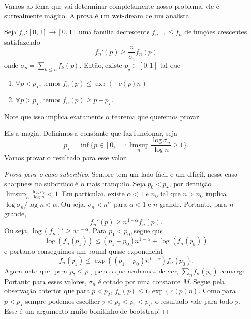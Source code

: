 Vamos ao lema que vai determinar completamente nosso problema, ele é
surrealmente mágico. A prova
é um wet-dream de um analista.

\begin{lemma}
	Seja $f_n : [0,1] \to [0,1]$ uma familia decrescente $f_{n+1} \leq
	f_n$ de funções crescentes
	satisfazendo
	\[
		f_n'(p) \geq \frac{n}{\sigma_n} f_n(p)
	\]
	onde $\sigma_n = \sum_{k \leq n} f_k(p)$. Então, existe $p_\star \in
	[0,1]$ tal que
	\begin{enumerate}
		\item $\forall p < p_\star$, temos $f_n(p) \leq \exp(-c(p)n)$.
		\item $\forall p > p_\star$, temos $f_n(p) \geq p - p_\star$.
	\end{enumerate}
\end{lemma}
\begin{remark}
	Note que isso implica exatamente o teorema que queremos provar.
\end{remark}

Eis a magia. Definimos a constante que faz funcionar, seja
\[
	p_\star = \inf \{ p \in [0,1] : \limsup_n \frac{\log \sigma_n}{\log
	n} \geq 1\}.
\]
Vamos provar o resultado para esse valor.

\begin{proof}[Prova para o caso subcrítico]
	Sempre tem um lado fácil e um difícil, nesse caso sharpness na subcrítico é
	o mais tranquilo. Seja $p_0 < p_\star$, por definição $\limsup_n
	\frac{\log \sigma_n}{\log n} < 1$.
	Em particular, existe $\alpha < 1$ e $n_0$ tal que $n > n_0$ implica
	$\log \sigma_n / \log n < \alpha$.
	Ou seja, $\sigma_n < n^{\alpha}$ para $\alpha < 1$ e $n$ grande.
	Portanto, para $n$ grande,
	\[
		f_n'(p) \geq n^{1-\alpha} f_n(p).
	\]
	Ou seja, $\log(f_n)' \geq n^{1-\alpha}$. Para $p_1 < p_0$, segue que
	\[
		\log(f_n(p_1)) \leq (p_1 - p_0)n^{1-\alpha} + \log(f_n(p_0))
	\]
	e portanto conseguimos um bound quase exponencial,
	\[
		f_n(p_1) \leq \exp((p_1 - p_0)n^{1 - \alpha})f_n(p_0).
	\]
	Agora note que, para $p_2 \leq p_1$, pelo o que acabamos de ver,
	$\sum_{n} f_n(p_2)$ converge.
	Portanto para esses valores, $\sigma_n$ é cotado por uma constante $M$.
	Segue pela observação anterior que para $p < p_2$, $f_n(p) \leq C\exp(c(p)n)$.
	Como para $p < p_\star$ sempre podemos escolher $p < p_2 < p_1 <
	p_\star$, o resultado
	vale para todo $p$. Esse é um argumento muito bonitinho de bootstrap!
\end{proof}

